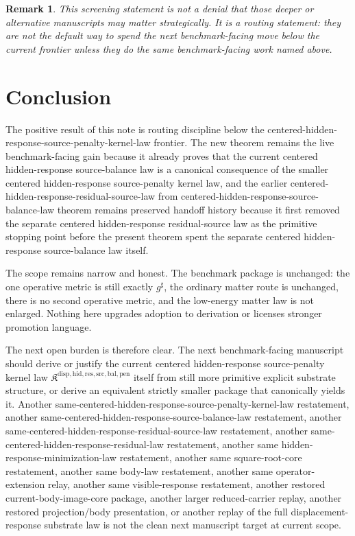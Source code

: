 \documentclass[11pt]{article}
\newcommand{\CompletedMetric}{g^{\sharp}}
\newcommand{\SourcePenaltyKernelLawPackage}{\mathfrak K^{\mathrm{disp,hid,res,src,bal,pen}}}
\newtheorem{remark}{Remark}
\begin{document}
\begin{remark}
This screening statement is not a denial that those deeper or alternative manuscripts may matter strategically. It is a routing statement: they are not the default way to spend the next benchmark-facing move below the current frontier unless they do the same benchmark-facing work named above.
\end{remark}

\section{Conclusion}

The positive result of this note is routing discipline below the centered-hidden-response-source-penalty-kernel-law frontier. The new theorem remains the live benchmark-facing gain because it already proves that the current centered hidden-response source-balance law is a canonical consequence of the smaller centered hidden-response source-penalty kernel law, and the earlier centered-hidden-response-residual-source-law from centered-hidden-response-source-balance-law theorem remains preserved handoff history because it first removed the separate centered hidden-response residual-source law as the primitive stopping point before the present theorem spent the separate centered hidden-response source-balance law itself.

The scope remains narrow and honest. The benchmark package is unchanged: the one operative metric is still exactly \(\CompletedMetric\), the ordinary matter route is unchanged, there is no second operative metric, and the low-energy matter law is not enlarged. Nothing here upgrades adoption to derivation or licenses stronger promotion language.

The next open burden is therefore clear. The next benchmark-facing manuscript should derive or justify the current centered hidden-response source-penalty kernel law \(\SourcePenaltyKernelLawPackage\) itself from still more primitive explicit substrate structure, or derive an equivalent strictly smaller package that canonically yields it. Another same-centered-hidden-response-source-penalty-kernel-law restatement, another same-centered-hidden-response-source-balance-law restatement, another same-centered-hidden-response-residual-source-law restatement, another same-centered-hidden-response-residual-law restatement, another same hidden-response-minimization-law restatement, another same square-root-core restatement, another same body-law restatement, another same operator-extension relay, another same visible-response restatement, another restored current-body-image-core package, another larger reduced-carrier replay, another restored projection/body presentation, or another replay of the full displacement-response substrate law is not the clean next manuscript target at current scope.
\end{document}
